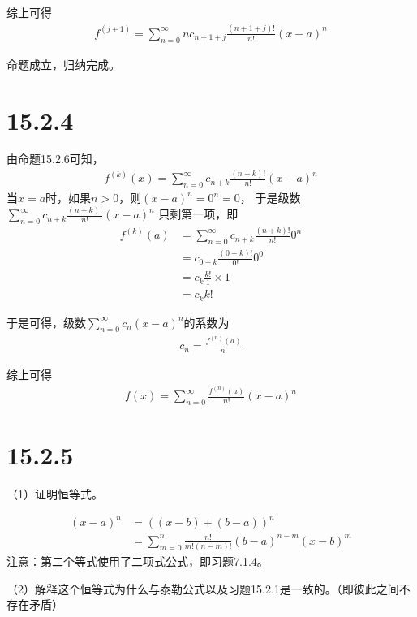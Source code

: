 \documentclass{article}
\begin{document}
综上可得
\begin{align*}
  f^{(j+1)} = \sum\limits_{n = 0}^\infty nc_{n+1+j}\frac{(n+1+j)!}{n!}(x - a)^{n}
\end{align*}

命题成立，归纳完成。

\section*{15.2.4}

由命题15.2.6可知，
\begin{align*}
  f^{(k)}(x) = \sum\limits_{n = 0}^\infty c_{n + k} \frac{(n + k)!}{n!}(x - a)^{n}
\end{align*}
当$x = a$时，如果$n > 0$，则$(x - a)^n = 0^n = 0$，
于是级数
$\sum\limits_{n = 0}^\infty c_{n + k} \frac{(n + k)!}{n!}(x - a)^{n}$
只剩第一项，即
\begin{align*}
  f^{(k)}(a)
   & = \sum\limits_{n = 0}^\infty c_{n + k} \frac{(n + k)!}{n!}0^{n} \\
   & = c_{0 + k}\frac{(0 + k)!}{0!}0^{0}                             \\
   & = c_{k}\frac{k!}{1} \times 1                                    \\
   & = c_{k}k!
\end{align*}

于是可得，级数$\sum\limits_{n = 0}^\infty c_n(x - a)^n$的系数为
\begin{align*}
  c_{n} = \frac{f^{(n)}(a)}{n!}
\end{align*}

综上可得
\begin{align*}
  f(x) = \sum\limits_{n = 0}^\infty \frac{f^{(n)}(a)}{n!}(x - a)^n
\end{align*}

\section*{15.2.5}
（1）证明恒等式。

\begin{align*}
  (x - a)^n & = ((x - b) + (b - a))^n                                                \\
            & = \sum\limits_{m = 0}^n \frac{n!}{m!(n - m)!} (b - a)^{n - m}(x - b)^m
\end{align*}
注意：第二个等式使用了二项式公式，即习题7.1.4。

（2）解释这个恒等式为什么与泰勒公式以及习题15.2.1是一致的。（即彼此之间不存在矛盾）
\end{document}
